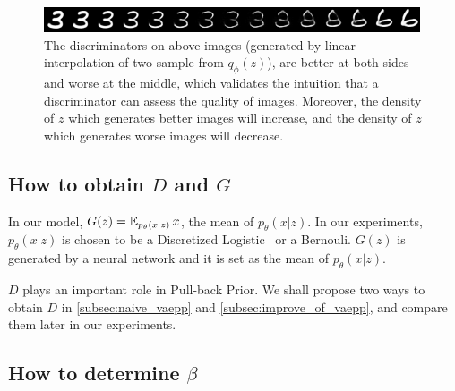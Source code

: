 \begin{figure}[tb]
	\centering
	\includegraphics[width=0.9\columnwidth]{../figures/interpolate}
	\caption{
	The discriminators on above images (generated by linear interpolation of two sample from $q_\phi(z)$), are better at both sides and worse at the middle, which validates the intuition that a discriminator can assess the quality of images. Moreover, the density of $z$ which generates better images will increase, and the density of $z$ which generates worse images will decrease. 
	}
	\label{fig:interpolate}
\end{figure}

\subsection{How to obtain $D$ and $G$}\label{subsec:determine_D_and_G}
In our model, $G(z) = \operatorname{\mathbb{E}}_{p_\theta(x|z)} x$, \IE the mean of $p_\theta(x|z)$.  In our experiments, $p_\theta(x|z)$ is chosen to be a Discretized Logistic~\protect\cite{salimans2017pixelcnn++} or a Bernouli. $G(z)$ is generated by a neural network and it is set as the mean of $p_\theta(x|z)$. 

$D$ plays an important role in Pull-back Prior. We shall propose two ways to obtain $D$ in \cref{subsec:naive_vaepp} and \cref{subsec:improve_of_vaepp}, and compare them later in our experiments. 

\subsection{How to determine $\beta$}\label{subsec:determine_beta}

